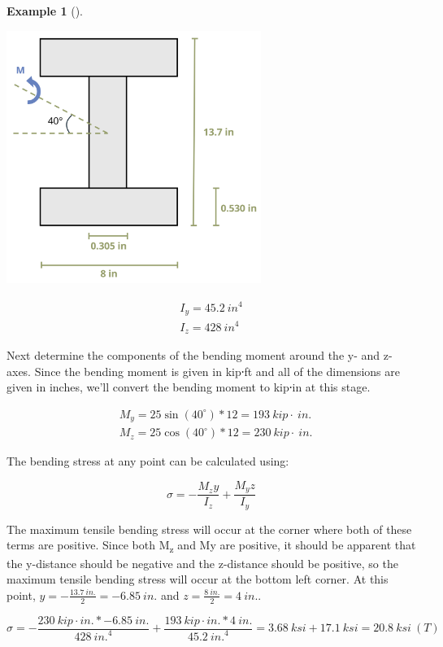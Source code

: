 \documentclass[
  letterpaper,
  DIV=11,
  numbers=noendperiod]{scrreprt}
\theoremstyle{definition}
\newtheorem{example}{Example}[chapter]
\theoremstyle{remark}
\begin{document}
\begin{tcolorbox}
\begin{example}[]
\begin{tcolorbox}
\begin{center}
\includegraphics[width=3.26042in,height=\textheight]{images/CH9 PNGs/Example 9.6 part 2.png}
\end{center}

\[
\begin{gathered}
I_y=45.2{~in}^4 \\
I_z=428{~in}^4
\end{gathered}
\]

Next determine the components of the bending moment around the y- and
z-axes. Since the bending moment is given in kip⸱ft and all of the
dimensions are given in inches, we'll convert the bending moment to
kip⸱in at this stage.

\[
\begin{aligned}
& M_y=25 \sin \left(40^{\circ}\right) * 12=193{~kip}\cdot{~in.} \\
& M_z=25 \cos \left(40^{\circ}\right) * 12=230{~kip}\cdot{~in.}
\end{aligned}
\]

The bending stress at any point can be calculated using:

\[
\sigma=-\frac{M_z y}{I_z}+\frac{M_y z}{I_y}
\]

The maximum tensile bending stress will occur at the corner where both
of these terms are positive. Since both M\textsubscript{z} and My are
positive, it should be apparent that the y-distance should be negative
and the z-distance should be positive, so the maximum tensile bending
stress will occur at the bottom left corner. At this point,
\(y=-\frac{13.7{~in.}}{2}=-6.85{~in.}\) and
\(z=\frac{8{~in.}}{2}=4{~in.}\).

\[
\sigma=-\frac{230{~kip}\cdot{in.} *-6.85{~in.}}{428{~in.}^4}+\frac{193{~kip}\cdot{in.} * 4{~in.}}{45.2{~in.}^4}=3.68{~ksi}+17.1{~ksi}=20.8{~ksi}~(T)
\]


\end{tcolorbox}
\end{example}
\end{tcolorbox}
\end{document}
